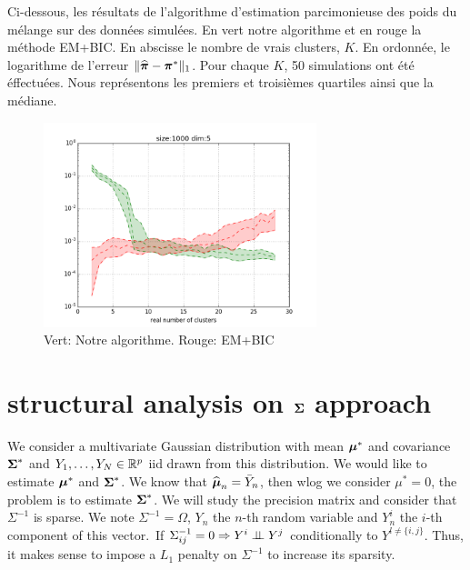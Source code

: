 Ci-dessous, les résultats de l'algorithme d'estimation parcimonieuse des poids du mélange sur des données simulées. En vert notre algorithme et en rouge la méthode EM+BIC. En abscisse le nombre de vrais clusters, $K$. En ordonnée, le logarithme de l'erreur $\|\widehat{\boldsymbol \pi}-\boldsymbol \pi^*\|_1$. Pour chaque $K$, 50 simulations ont été éffectuées. Nous représentons les premiers et troisièmes quartiles ainsi que la médiane.
\begin{figure}[H]
\center
  \includegraphics[width=300px]{./TeX_files/SparseWeightsVectorEstimation.png}
  \caption{Vert: Notre algorithme. Rouge: EM+BIC}
\end{figure}
%

\section{structural analysis on $\boldsymbol\Sigma$ approach}

We consider a multivariate Gaussian distribution with mean $\boldsymbol\mu^*$ and covariance $\boldsymbol\Sigma^*$ and $Y_1,\dots,Y_N \in {\mathbb R}^p$ iid drawn from this distribution. We would like to estimate $\boldsymbol\mu^*$ and $\boldsymbol\Sigma^*$. We know that $\widehat{\boldsymbol\mu}_n=\bar Y_n$, then wlog we consider $\mu^*=0$, the problem is to estimate $\boldsymbol\Sigma^*$. We will study the precision matrix and consider that $\Sigma^{-1}$ is sparse. We note $\Sigma^{-1}=\Omega$, $Y_n$ the $n$-th random variable and $Y_n^i$ the $i$-th component of this vector.\
If $\Sigma^{-1}_{ij}=0 \Rightarrow Y^i \perp\!\!\!\perp Y^j$ conditionally to $Y^{l\ne\{i,j\}}$. Thus, it makes sense to impose a $L_1$ penalty on $\Sigma^{-1}$ to increase its sparsity.

